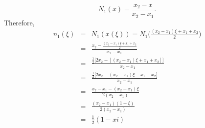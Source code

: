 \documentclass{article}
\newcommand{\beq}{\begin{equation}}
\newcommand{\eeq}{\end{equation}}
\newcommand{\ber}{\begin{eqnarray}}
\newcommand{\eer}{\end{eqnarray}}
\begin{document}
\beq
\label{eqn:defglobalN1}
N_1(x) = \frac{x_2 - x}{x_2 - x_1}.
\eeq
Therefore,
\ber
n_1(\xi)&=&N_1(x(\xi)) = N_1\Big(\frac{(x_2 - x_1)\xi + x_1 + x_2}{2}\Big) \nonumber \\
        &=& \frac{x_2 - \frac{(x_2-x_1)\xi + x_1 + x_2}{2}}{x_2-x_1} \nonumber \\
        &=& \frac{\frac{1}{2}\Big[2x_2-[(x_2-x_1)\xi + x_1 + x_2]\Big]}{x_2-x_1} \nonumber \\
        &=& \frac{\frac{1}{2}\Big[2x_2-(x_2-x_1)\xi - x_1 - x_2\Big]}{x_2-x_1} \nonumber \\
        &=& \frac{x_2 - x_1 - (x_2-x_1)\xi}{2(x_2 - x_1)} \nonumber \\
        &=& \frac{(x_2-x_1)(1-\xi)}{2(x_2 - x_1)} \nonumber \\
        &=& \frac{1}{2}(1-xi) \label{eqn:localbasis}
\eer
\end{document}

